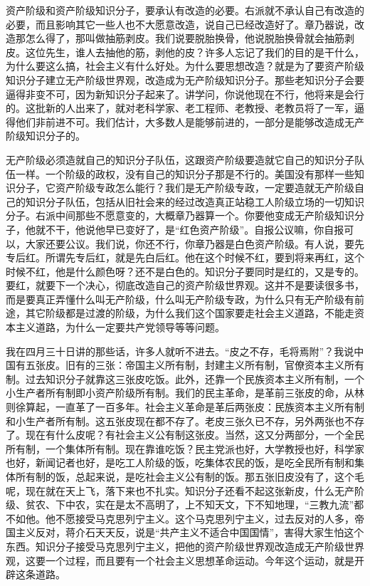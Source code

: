 资产阶级和资产阶级知识分子，要承认有改造的必要。右派就不承认自己有改造的必要，而且影响其它一些人也不大愿意改造，说自己已经改造好了。章乃器说，改造那怎么得了，那叫做抽筋剥皮。我们说要脱胎换骨，他说脱胎换骨就会抽筋剥皮。这位先生，谁人去抽他的筋，剥他的皮？许多人忘记了我们的目的是干什么，为什么要这么搞，社会主义有什么好处。为什么要思想改造？就是为了要资产阶级知识分子建立无产阶级世界观，改造成为无产阶级知识分子。那些老知识分子会要逼得非变不可，因为新知识分子起来了。讲学问，你说他现在不行，他将来是会行的。这批新的人出来了，就对老科学家、老工程师、老教授、老教员将了一军，逼得他们非前进不可。我们估计，大多数人是能够前进的，一部分是能够改造成无产阶级知识分子的。

无产阶级必须造就自己的知识分子队伍，这跟资产阶级要造就它自己的知识分子队伍一样。一个阶级的政权，没有自己的知识分子那是不行的。美国没有那样一些知识分子，它资产阶级专政怎么能行？我们是无产阶级专政，一定要造就无产阶级自己的知识分子队伍，包括从旧社会来的经过改造真正站稳工人阶级立场的一切知识分子。右派中间那些不愿意变的，大概章乃器算一个。你要他变成无产阶级知识分子，他就不干，他说他早已变好了，是“红色资产阶级”。自报公议嘛，你自报可以，大家还要公议。我们说，你还不行，你章乃器是白色资产阶级。有人说，要先专后红。所谓先专后红，就是先白后红。他在这个时候不红，要到将来再红，这个时候不红，他是什么颜色呀？还不是白色的。知识分子要同时是红的，又是专的。要红，就要下一个决心，彻底改造自己的资产阶级世界观。这并不是要读很多书，而是要真正弄懂什么叫无产阶级，什么叫无产阶级专政，为什么只有无产阶级有前途，其它阶级都是过渡的阶级，为什么我们这个国家要走社会主义道路，不能走资本主义道路，为什么一定要共产党领导等等问题。

我在四月三十日讲的那些话，许多人就听不进去。“皮之不存，毛将焉附”？我说中国有五张皮。旧有的三张：帝国主义所有制，封建主义所有制，官僚资本主义所有制。过去知识分子就靠这三张皮吃饭。此外，还靠一个民族资本主义所有制，一个小生产者所有制即小资产阶级所有制。我们的民主革命，是革前三张皮的命，从林则徐算起，一直革了一百多年。社会主义革命是革后两张皮：民族资本主义所有制和小生产者所有制。这五张皮现在都不存了。老皮三张久已不存，另外两张也不存了。现在有什么皮呢？有社会主义公有制这张皮。当然，这又分两部分，一个全民所有制，一个集体所有制。现在靠谁吃饭？民主党派也好，大学教授也好，科学家也好，新闻记者也好，是吃工人阶级的饭，吃集体农民的饭，是吃全民所有制和集体所有制的饭，总起来说，是吃社会主义公有制的饭。那五张旧皮没有了，这个毛呢，现在就在天上飞，落下来也不扎实。知识分子还看不起这张新皮，什么无产阶级、贫农、下中农，实在是太不高明了，上不知天文，下不知地理，“三教九流”都不如他。他不愿接受马克思列宁主义。这个马克思列宁主义，过去反对的人多，帝国主义反对，蒋介石天天反，说是“共产主义不适合中国国情”，害得大家生怕这个东西。知识分子接受马克思列宁主义，把他的资产阶级世界观改造成无产阶级世界观，这要一个过程，而且要有一个社会主义思想革命运动。今年这个运动，就是开辟这条道路。

